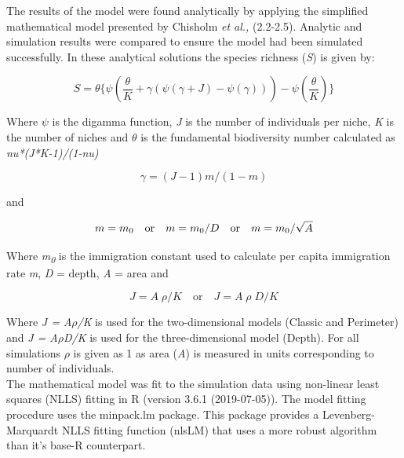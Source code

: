 \noindent The results of the model were found analytically by applying the simplified mathematical model presented by Chisholm \textit{et al.,} (2.2-2.5).
Analytic and simulation results were compared to ensure the model had been simulated successfully. In these analytical solutions the species richness (\textit{S}) is given by: 

\begin{equation}
S=\theta\{\psi(\frac{\theta}{K}+\gamma(\psi(\gamma+J)-\psi(\gamma)))-\psi(\frac{\theta}{K})\}
\end{equation} 

\begin{center}
\noindent Where $\psi$ is the digamma function, \textit{J} is the number of individuals per niche, \textit{K} is the number of niches and $\theta$ is the fundamental biodiversity number calculated as \textit{nu*(J*K-1)/(1-nu)} 
\end{center}

\begin{equation}
\gamma=(J-1)m/(1-m)
\end{equation}

\begin{center}
and 
\end{center}

\begin{equation}
 m=m\textsubscript{0}
 \quad\mathrm{or}\quad
 m=m\textsubscript{0}/D   
 \quad\mathrm{or}\quad
 m = m\textsubscript{0}/\sqrt{A}
\end{equation}

\noindent Where \textit{m\textsubscript{0}} is the immigration constant used to calculate per capita immigration rate \textit{m}, \textit{D} = depth, \textit{A} = area and

\begin{equation}
J=A\;{\rho}/K
 \quad\mathrm{or}\quad
J=A\;{\rho}\;D/K
\end{equation}

\noindent Where \textit{J = A\;$\rho$/K} is used for the two-dimensional models (Classic and Perimeter) and \textit{J = A\;$\rho$\;D/K} is used for the three-dimensional model (Depth). For all simulations $\rho$ is given as 1 as area (\textit{A}) is measured in units corresponding to number of individuals. \\

\noindent The mathematical model was fit to the simulation data using non-linear least squares (NLLS) fitting in R (version 3.6.1 (2019-07-05)). The model fitting procedure uses the minpack.lm package. This package provides a Levenberg-Marquardt NLLS fitting function (nlsLM) that uses a more robust algorithm than it's base-R counterpart. \\

